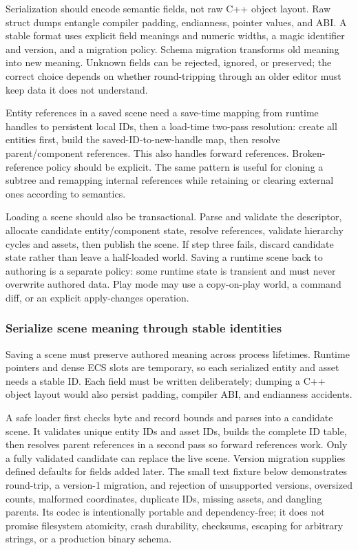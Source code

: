 Serialization should encode semantic fields, not raw C++ object layout. Raw struct dumps entangle compiler padding, endianness, pointer values, and ABI. A stable format uses explicit field meanings and numeric widths, a magic identifier and version, and a migration policy. Schema migration transforms old meaning into new meaning. Unknown fields can be rejected, ignored, or preserved; the correct choice depends on whether round-tripping through an older editor must keep data it does not understand.

Entity references in a saved scene need a save-time mapping from runtime handles to persistent local IDs, then a load-time two-pass resolution: create all entities first, build the saved-ID-to-new-handle map, then resolve parent/component references. This also handles forward references. Broken-reference policy should be explicit. The same pattern is useful for cloning a subtree and remapping internal references while retaining or clearing external ones according to semantics.

Loading a scene should also be transactional. Parse and validate the descriptor, allocate candidate entity/component state, resolve references, validate hierarchy cycles and assets, then publish the scene. If step three fails, discard candidate state rather than leave a half-loaded world. Saving a runtime scene back to authoring is a separate policy: some runtime state is transient and must never overwrite authored data. Play mode may use a copy-on-play world, a command diff, or an explicit apply-changes operation.

\subsubsection{Serialize scene meaning through stable identities}\label{05-engine-i-ch008-serialize-scene-meaning-through-stable-identities}

\hypertarget{05-engine-i-ch008-serialize-scene-meaning-through-stable-identities}{}

Saving a scene must preserve authored meaning across process lifetimes. Runtime pointers and dense ECS slots are temporary, so each serialized entity and asset needs a stable ID. Each field must be written deliberately; dumping a C++ object layout would also persist padding, compiler ABI, and endianness accidents.

A safe loader first checks byte and record bounds and parses into a candidate scene. It validates unique entity IDs and asset IDs, builds the complete ID table, then resolves parent references in a second pass so forward references work. Only a fully validated candidate can replace the live scene. Version migration supplies defined defaults for fields added later. The small text fixture below demonstrates round-trip, a version-1 migration, and rejection of unsupported versions, oversized counts, malformed coordinates, duplicate IDs, missing assets, and dangling parents. Its codec is intentionally portable and dependency-free; it does not promise filesystem atomicity, crash durability, checksums, escaping for arbitrary strings, or a production binary schema.

